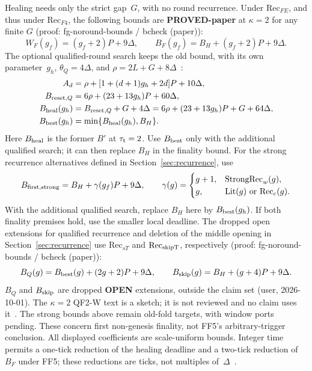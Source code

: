 \documentclass{article}
\theoremstyle{plain}
\theoremstyle{definition}
\theoremstyle{remark}
\newcommand{\OPEN}{\textbf{OPEN}}
\begin{document}
Healing needs only the strict gap~$G$, with no round recurrence.
Under $\mathrm{Rec}_{FE}$, and thus under $\mathrm{Rec}_{F4}$, the following
bounds are \textbf{PROVED-paper} at $\kappa=2$ for any finite $G$
(proof: fg-noround-bounds / bcheck (paper)):
\[
 W_F(g_f)=(g_f+2)P+9\Delta,\qquad
 B_F(g_f)=B_H+(g_f+2)P+9\Delta.
\]
The optional qualified-round search keeps the old bound, with its own
parameter~$g_h$, $\theta_Q=4\Delta$, and
$\rho=2L+G+8\Delta$~\cite[H.9-Q--H.11-Q, H.20]{BPH}:
\begin{align*}
 A_d&=\rho+[1+(d+1)g_h+2d]P+10\Delta,\\
 B_{{\rm reset},Q}&=6\rho+(23+13g_h)P+60\Delta,\\
 B_{\rm heal}(g_h)&=B_{{\rm reset},Q}+G+4\Delta
                   =6\rho+(23+13g_h)P+G+64\Delta,\\
 B_{\rm best}(g_h)&=\min\{B_{\rm heal}(g_h),B_H\}.
\end{align*}
Here $B_{\rm heal}$ is the former $B'$ at $\tau_{\rm t}=2$.
Use $B_{\rm best}$ only with the additional qualified search;
it can then replace $B_H$ in the finality bound.
For the strong recurrence alternatives defined in
Section~\ref{sec:recurrence}, use~\cite[FF5-S]{BPF}
\[
 B_{{\rm first},{\rm strong}}=B_H+\gamma(g_f)P+9\Delta,\qquad
 \gamma(g)=\begin{cases}
  g+1,&\mathrm{StrongRec}_{w}(g),\\
  g,&\mathrm{Lit}(g)\text{ or }\mathrm{Rec}_{c}(g).
 \end{cases}
\]
With the additional qualified search, replace $B_H$ here by
$B_{\rm best}(g_h)$.  If both finality premises hold, use the smaller
local deadline.  The dropped open extensions for qualified recurrence and deletion of
the middle opening in Section~\ref{sec:recurrence} use $\mathrm{Rec}_{sT}$
and $\mathrm{Rec}_{\rm skipT}$, respectively
(proof: fg-noround-bounds / bcheck (paper)):
\[
 B_Q(g)=B_{\rm best}(g)+(2g+2)P+9\Delta,\qquad
 B_{\rm skip}(g)=B_H+(g+4)P+9\Delta.
\]
$B_Q$ and $B_{\rm skip}$ are dropped \OPEN{} extensions, outside the claim set
(user, 2026-10-01).  The $\kappa=2$ QF2-W text is a sketch; it is not
reviewed and no claim uses it~\cite[QF2-W]{BPF}.
The strong bounds above remain old-fold targets, with window ports pending.
These concern first non-genesis finality, not FF5's arbitrary-trigger conclusion.  All displayed coefficients are
scale-uniform bounds.  Integer time permits a one-tick reduction of
the healing deadline and a two-tick reduction of $B_F$ under FF5;
these reductions are ticks, not multiples of~$\Delta$~\cite[\S9]{BPH}.
\end{document}
